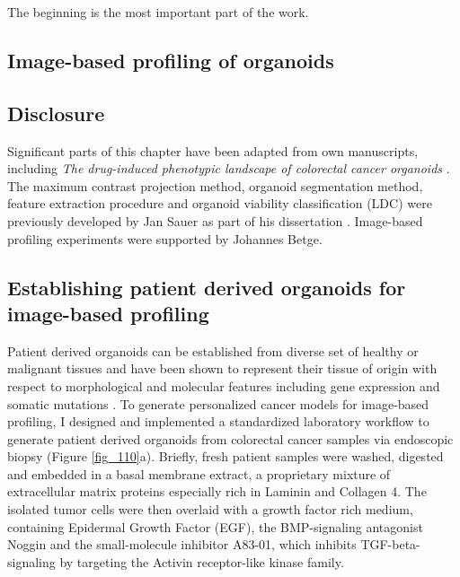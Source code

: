 \begin{savequote}[75mm]
The beginning is the most important part of the work.
\end{savequote}

\begin{flushleft}
\chapter{Image-based profiling of organoids}

\section{Disclosure}
Significant parts of this chapter have been adapted from own manuscripts, including \textit{The drug-induced phenotypic landscape of colorectal cancer organoids} \citep{Betge2022-kr}. The maximum contrast projection method, organoid segmentation method, feature extraction procedure and organoid viability classification (LDC) were previously developed by Jan Sauer as part of his dissertation \citep{noauthor_undated-ij}. Image-based profiling experiments were supported by Johannes Betge. 

\section{Establishing patient derived organoids for image-based profiling}

Patient derived organoids can be established from diverse set of healthy or malignant tissues and have been shown to represent their tissue of origin with respect to morphological and molecular features including gene expression and somatic mutations \citep{Fujii2016-ax, Weeber2015-sn, Van_De_Wetering2015-ko, Sato2011-lh,  Broutier2017-wg}. To generate personalized cancer models for image-based profiling, I designed and implemented a standardized laboratory workflow to generate patient derived organoids from colorectal cancer samples via endoscopic biopsy (Figure \ref{fig_110}a). Briefly, fresh patient samples were washed, digested and embedded in a basal membrane extract, a proprietary mixture of extracellular matrix proteins especially rich in Laminin and Collagen 4. The isolated tumor cells were then overlaid with a growth factor rich medium, containing Epidermal Growth Factor (EGF), the BMP-signaling antagonist Noggin and the small-molecule inhibitor A83-01, which inhibits TGF-beta-signaling by targeting the Activin receptor-like kinase family.


\end{flushleft}

